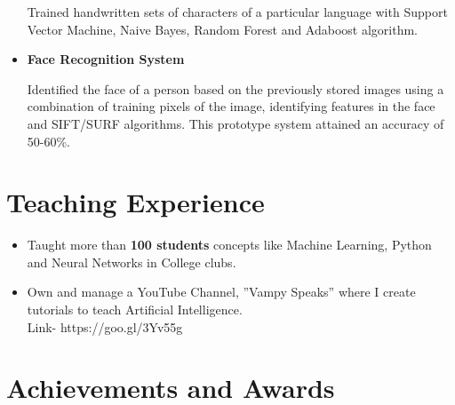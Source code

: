 \documentclass[11pt,a4paper,sans]{moderncv}        %
\begin{document}
\begin{itemize}
{\small{Trained handwritten sets of characters of a particular language with Support Vector Machine, Naive Bayes, Random Forest and Adaboost algorithm.}}
\vspace{5pt}

\item{\textbf{Face Recognition System} 

\vspace{3pt}

\small{Identified the face of a person based on the previously stored images using a combination of training pixels of the image, identifying features in the face and SIFT/SURF algorithms. This prototype system attained an accuracy of 50-60\%.}}

\vspace{5pt}



\end{itemize}

\section{Teaching Experience}
\vspace{5pt}
\begin{itemize}
\item{Taught more than \textbf{100 students} concepts like Machine Learning, Python and Neural Networks in College clubs.}
\vspace{5pt}
\item{Own and manage a YouTube Channel, ”Vampy Speaks” where I create tutorials to teach Artificial Intelligence. \\ Link- https://goo.gl/3Yv55g}
\end{itemize}

\section{Achievements and Awards}

\vspace{5pt}
\end{document}
